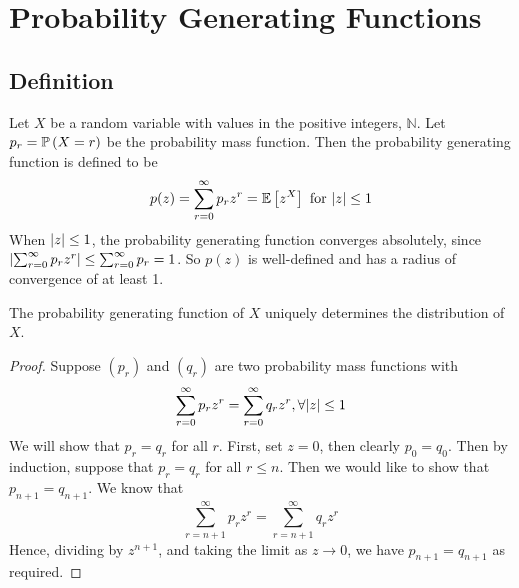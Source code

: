 \documentclass{article}
\begin{document}
\section{Probability Generating Functions}
\subsection{Definition}
Let $X$ be a random variable with values in the positive integers, $\mathbb N$. Let $p_r = \mathbb{P}\left({X = r}\right)$ be the probability mass function. Then the probability generating function is defined to be
\[ p(z) = \sum_{r=0}^\infty p_r z^r = \mathbb{E}\left[{z^X}\right] \text{ for } \abs{z} \leq 1 \]
When $\abs{z} \leq 1$, the probability generating function converges absolutely, since $\abs{\sum_{r=0}^\infty p_r z^r} \leq \sum_{r=0}^\infty p_r = 1$. So $p(z)$ is well-defined and has a radius of convergence of at least 1.
\begin{theorem}
    The probability generating function of $X$ uniquely determines the distribution of $X$.
\end{theorem}
\begin{proof}
    Suppose $(p_r)$ and $(q_r)$ are two probability mass functions with
    \[ \sum_{r=0}^\infty p_r z^r = \sum_{r=0}^\infty q_r z^r, \forall \abs{z} \leq 1 \]
    We will show that $p_r = q_r$ for all $r$. First, set $z = 0$, then clearly $p_0 = q_0$. Then by induction, suppose that $p_r = q_r$ for all $r \leq n$. Then we would like to show that $p_{n+1} = q_{n+1}$. We know that
    \[ \sum_{r=n+1}^\infty p_r z^r = \sum_{r=n+1}^\infty q_r z^r \]
    Hence, dividing by $z^{n+1}$, and taking the limit as $z \to 0$, we have $p_{n+1} = q_{n+1}$ as required.
\end{proof}
\end{document}
